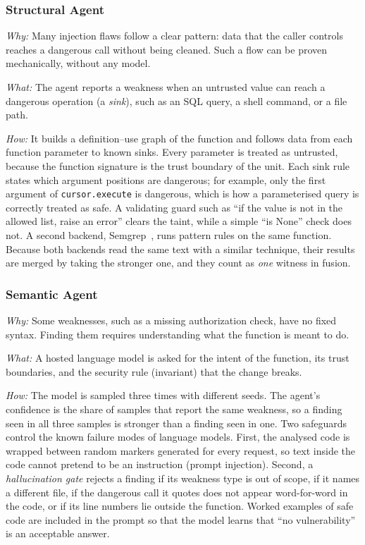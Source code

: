 \documentclass[conference]{IEEEtran}
\begin{document}
\subsubsection{Structural Agent}
\textit{Why:} Many injection flaws follow a clear pattern: data that the
caller controls reaches a dangerous call without being cleaned. Such a
flow can be proven mechanically, without any model.

\textit{What:} The agent reports a weakness when an untrusted value can
reach a dangerous operation (a \emph{sink}), such as an SQL query, a shell
command, or a file path.

\textit{How:} It builds a definition--use graph of the function and follows
data from each function parameter to known sinks. Every parameter is
treated as untrusted, because the function signature is the trust boundary
of the unit. Each sink rule states which argument positions are dangerous;
for example, only the first argument of \texttt{cursor.execute} is
dangerous, which is how a parameterised query is correctly treated as
safe. A validating guard such as ``if the value is not in the allowed list,
raise an error'' clears the taint, while a simple ``is None'' check does
not. A second backend, Semgrep~\cite{semgrep}, runs pattern rules on the
same function. Because both backends read the same text with a similar
technique, their results are merged by taking the stronger one, and they
count as \emph{one} witness in fusion.

\subsubsection{Semantic Agent}
\textit{Why:} Some weaknesses, such as a missing authorization check, have
no fixed syntax. Finding them requires understanding what the function is
meant to do.

\textit{What:} A hosted language model is asked for the intent of the
function, its trust boundaries, and the security rule (invariant) that the
change breaks.

\textit{How:} The model is sampled three times with different seeds. The
agent's confidence is the share of samples that report the same weakness,
so a finding seen in all three samples is stronger than a finding seen in
one. Two safeguards control the known failure modes of language models.
First, the analysed code is wrapped between random markers generated for
every request, so text inside the code cannot pretend to be an instruction
(prompt injection). Second, a \emph{hallucination gate} rejects a finding
if its weakness type is out of scope, if it names a different file, if the
dangerous call it quotes does not appear word-for-word in the code, or if
its line numbers lie outside the function. Worked examples of safe code are
included in the prompt so that the model learns that ``no vulnerability''
is an acceptable answer.
\end{document}
